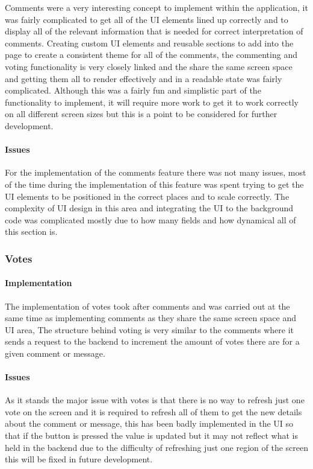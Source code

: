 Comments were a very interesting concept to implement within the application, it was fairly complicated to get all of the UI elements lined up correctly and to display all of the relevant information that is needed for correct interpretation of comments. Creating custom UI elements and reusable sections to add into the page to create a consistent theme for all of the comments, the commenting and voting functionality is very closely linked and the share the same screen space and getting them all to render effectively and in a readable state was fairly complicated. Although this was a fairly fun and simplistic part of the functionality to implement, it will require more work to get it to work correctly on all different screen sizes but this is a point to be considered for further development.

\paragraph*{Issues}

For the implementation of the comments feature there was not many issues, most of the time during the implementation of this feature was spent trying to get the UI elements to be positioned in the correct places and to scale correctly. The complexity of UI design in this area and integrating the UI to the background code was complicated mostly due to how many fields and how dynamical all of this section is.

\subsubsection*{Votes}

\paragraph*{Implementation}

The implementation of votes took after comments and was carried out at the same time as implementing comments as they share the same screen space and UI area, The structure behind voting is very similar to the comments where it sends a request to the backend to increment the amount of votes there are for a given comment or message.

\paragraph*{Issues}

As it stands the major issue with votes is that there is no way to refresh just one vote on the screen and it is required to refresh all of them to get the new details about the comment or message, this has been badly implemented in the UI so that if the button is pressed the value is updated but it may not reflect what is held in the backend due to the difficulty of refreshing just one region of the screen this will be fixed in future development.

